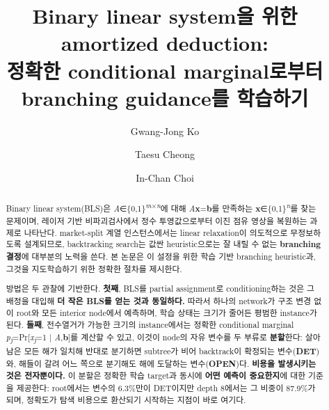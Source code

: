 \documentclass[final,5p,twocolumn]{elsarticle}
\begin{document}
\begin{frontmatter}

\title{Binary linear system을 위한 amortized deduction:\\
정확한 conditional marginal로부터 branching guidance를 학습하기}

\author[ku]{Gwang-Jong Ko}
\author[ku]{Taesu Cheong}
\author[ku]{In-Chan Choi}

\begin{abstract}
Binary linear system(BLS)은 \textit{A}∈\{0,1\}\textsuperscript{\textit{m}×\textit{n}}에 대해 \textit{A}\textbf{x}=\textbf{b}를 만족하는 \textbf{x}∈\{0,1\}\textsuperscript{\textit{n}}를 찾는 문제이며, 레이저 기반 비파괴검사에서 정수 투영값으로부터 이진 점유 영상을 복원하는 과제로 나타난다. market-split 계열 인스턴스에서는 linear relaxation이 의도적으로 무정보하도록 설계되므로, backtracking search는 값싼 heuristic으로는 잘 내릴 수 없는 \textbf{branching 결정}에 대부분의 노력을 쓴다. 본 논문은 이 설정을 위한 학습 기반 branching heuristic과, 그것을 지도학습하기 위한 정확한 절차를 제시한다.

방법은 두 관찰에 기반한다. \textbf{첫째}, BLS를 partial assignment로 conditioning하는 것은 그 배정을 대입해 \textbf{더 작은 BLS를 얻는 것과 동일하다.} 따라서 하나의 network가 구조 변경 없이 root와 모든 interior node에서 예측하며, 학습 상태는 크기가 줄어든 평범한 instance가 된다. \textbf{둘째}, 전수열거가 가능한 크기의 instance에서는 정확한 conditional marginal \textit{p\textsubscript{j}}=Pr[\textit{x\textsubscript{j}}=1 | \textit{A},\textbf{b}]를 계산할 수 있고, 이것이 node의 자유 변수를 두 부류로 \textbf{분할}한다: 살아남은 모든 해가 일치해 반대로 분기하면 subtree가 비어 backtrack이 확정되는 변수(\textbf{DET})와, 해들이 갈려 어느 쪽으로 분기해도 해에 도달하는 변수(\textbf{OPEN})다. \textbf{비용을 발생시키는 것은 전자뿐이다.} 이 분할은 정확한 학습 target과 동시에 \textbf{어떤 예측이 중요한지}에 대한 기준을 제공한다: root에서는 변수의 6.3\%만이 DET이지만 depth 8에서는 그 비중이 87.9\%가 되며, 정확도가 탐색 비용으로 환산되기 시작하는 지점이 바로 여기다.


\end{abstract}
\end{frontmatter}
\end{document}
